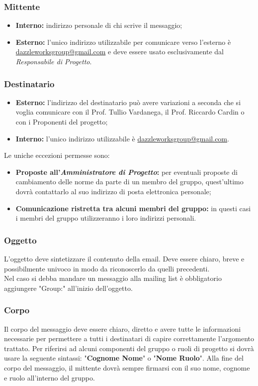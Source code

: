 		\subsubsection{Mittente}
\begin{itemize}
	\item \textbf{Interno:} indirizzo personale di chi scrive il messaggio;
	\item \textbf{Esterno:} l'unico indirizzo utilizzabile per comunicare verso l'esterno è \url{dazzleworksgroup@gmail.com} e deve essere usato esclusivamente dal \textit{Responsabile di Progetto}.
\end{itemize}
	\subsubsection{Destinatario}
\begin{itemize}
	\item \textbf{Esterno:} l'indirizzo del destinatario può avere variazioni a seconda che si voglia comunicare con il Prof. Tullio Vardanega, il Prof. Riccardo Cardin o con i Proponenti del progetto;
	\item \textbf{Interno:} l'unico indirizzo utilizzabile è \url{dazzleworksgroup@gmail.com}.
\end{itemize}
Le uniche eccezioni permesse sono:
\begin{itemize}
	\item \textbf{Proposte all'\textit{Amministratore di Progetto}:} per eventuali proposte di cambiamento delle norme da parte di un membro del gruppo, quest'ultimo dovrà contattarlo al suo indirizzo di posta elettronica personale;
	\item \textbf{Comunicazione ristretta tra alcuni membri del gruppo:} in questi casi i membri del gruppo utilizzeranno i loro indirizzi personali.
\end{itemize}

		\subsubsection{Oggetto}
L'oggetto deve sintetizzare il contenuto della email. Deve essere chiaro, breve e possibilmente univoco in modo da riconoscerlo da quelli precedenti.\\
Nel caso si debba mandare un messaggio alla mailing list è obbligatorio aggiungere "Group:" all'inizio dell'oggetto.
		\subsubsection{Corpo}
Il corpo del messaggio deve essere chiaro, diretto e avere tutte le informazioni necessarie per permettere a tutti i destinatari di capire correttamente l'argomento trattato. Per riferirsi ad alcuni componenti del gruppo o ruoli di progetto si dovrà usare la seguente sintassi: "\textbf{Cognome Nome}" o "\textbf{Nome Ruolo}". Alla fine del corpo del messaggio, il mittente dovrà sempre firmarsi con il suo nome, cognome e ruolo all'interno del gruppo.
